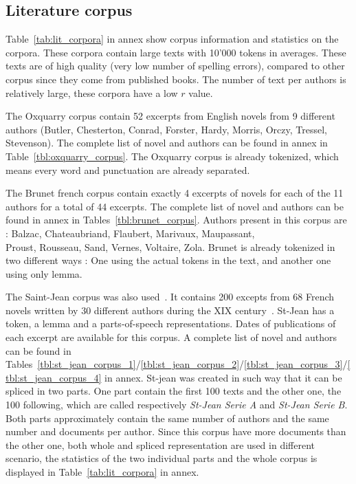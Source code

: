 \subsection{Literature corpus}
\label{sec:lit_corpus}

Table~\ref{tab:lit_corpora} in annex show corpus information and statistics on the corpora.
These corpora contain large texts with 10'000 tokens in averages.
These texts are of high quality (very low number of spelling errors), compared to other corpus since they come from published books.
The number of text per authors is relatively large, these corpora have a low $r$ value.

The Oxquarry corpus contain 52 excerpts from English novels from 9 different authors (Butler, Chesterton, Conrad, Forster, Hardy, Morris, Orczy, Tressel, Stevenson).
The complete list of novel and authors can be found in annex in Table~\ref{tbl:oxquarry_corpus}.
The Oxquarry corpus is already tokenized, which means every word and punctuation are already separated.

The Brunet french corpus contain exactly 4 excerpts of novels for each of the 11 authors for a total of 44 excerpts.
The complete list of novel and authors can be found in annex in Tables~\ref{tbl:brunet_corpus}.
Authors present in this corpus are : Balzac, Chateaubriand, Flaubert, Marivaux, Maupassant, \\
Proust, Rousseau, Sand, Vernes, Voltaire, Zola.
Brunet is already tokenized in two different ways : One using the actual tokens in the text, and another one using only lemma.

The Saint-Jean corpus was also used~\cite{unine_corpus}.
It contains 200 excepts from 68 French novels written by 30 different authors during the XIX century~\cite{st_jean}.
St-Jean has a token, a lemma and a parts-of-speech representations.
Dates of publications of each excerpt are available for this corpus.
A complete list of novel and authors can be found in Tables~\ref{tbl:st_jean_corpus_1}/\ref{tbl:st_jean_corpus_2}/\ref{tbl:st_jean_corpus_3}/\ref{tbl:st_jean_corpus_4} in annex.
St-jean was created in such way that it can be spliced in two parts.
One part contain the first 100 texts and the other one, the 100 following, which are called respectively \textit{St-Jean Serie A} and \textit{St-Jean Serie B}.
Both parts approximately contain the same number of authors and the same number and documents per author.
Since this corpus have more documents than the other one, both whole and spliced representation are used in different scenario, the statistics of the two individual parts and the whole corpus is displayed in Table~\ref{tab:lit_corpora} in annex.
